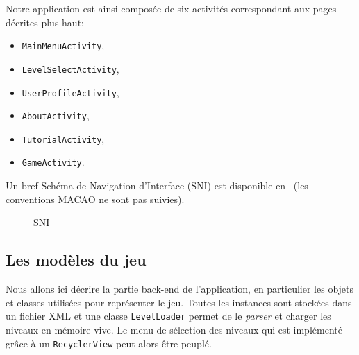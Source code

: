 \documentclass[../main.tex]{subfiles}
\begin{document}
Notre application est ainsi composée de six activités correspondant aux pages décrites plus haut: 
\begin{itemize}
    \item \texttt{MainMenuActivity},
    \item \texttt{LevelSelectActivity},
    \item \texttt{UserProfileActivity},
    \item \texttt{AboutActivity},
    \item \texttt{TutorialActivity},
    \item \texttt{GameActivity}.
\end{itemize}
Un bref Schéma de Navigation d'Interface (SNI) est disponible en~ (les conventions MACAO ne sont pas suivies).
\begin{figure}[ht!]
\caption{SNI}
\label{fig-sni}
\end{figure}

	\subsection{Les modèles du jeu}

Nous allons ici décrire la partie back-end de l'application, en particulier les objets et classes utilisées pour représenter le jeu. Toutes les instances sont stockées dans un fichier XML et une classe \texttt{LevelLoader} permet de le \textit{parser} et charger les niveaux en mémoire vive. Le menu de sélection des niveaux qui est implémenté grâce à un \texttt{RecyclerView} peut alors être peuplé.
\end{document}
